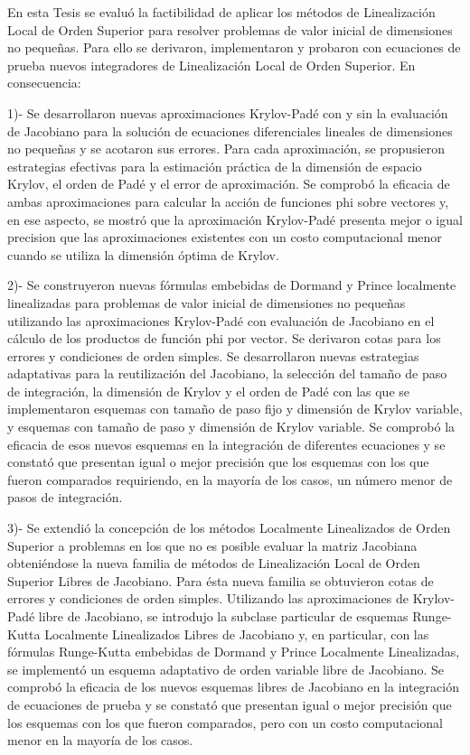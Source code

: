 \begin{conclusions}
	
	En esta Tesis se evaluó la factibilidad de aplicar los métodos de Linealización Local de Orden Superior para resolver problemas de valor inicial de dimensiones no pequeñas. Para ello se derivaron, implementaron y probaron con ecuaciones de prueba nuevos integradores de Linealización Local de Orden Superior. En consecuencia:
	
	1)- Se desarrollaron nuevas aproximaciones Krylov-Padé con y sin la evaluación de Jacobiano para la solución de ecuaciones diferenciales lineales de dimensiones no pequeñas y se acotaron sus errores.
	Para cada aproximación, se propusieron estrategias efectivas para la estimación práctica de la dimensión de espacio Krylov, el orden de Padé y el error de aproximación. Se comprobó la eficacia de
	ambas aproximaciones para calcular la acción de funciones phi sobre vectores y, en ese aspecto, se 	mostró que la aproximación Krylov-Padé 
	presenta mejor o igual precision que las aproximaciones existentes con un costo computacional menor cuando se utiliza la dimensión óptima de Krylov.
	
	2)- Se construyeron nuevas fórmulas embebidas de Dormand y Prince localmente linealizadas para problemas de valor inicial de dimensiones no pequeñas utilizando las aproximaciones Krylov-Padé
	con evaluación de Jacobiano en el cálculo de los productos de función phi por vector. Se derivaron cotas para los errores y condiciones de orden simples. Se desarrollaron nuevas estrategias adaptativas para la reutilización del Jacobiano, la selección del tamaño de paso de integración, la dimensión de Krylov
	y el orden de Padé con las que se implementaron esquemas con tamaño de paso fijo y dimensión 	de Krylov variable, y esquemas con tamaño de paso y dimensión de Krylov variable. Se comprobó
	la eficacia de esos nuevos esquemas en la integración de diferentes ecuaciones y se constató que presentan igual o mejor precisión que los esquemas con los que fueron comparados requiriendo, en
	la mayoría de los casos, un número menor de pasos de integración.
	
	3)- Se extendió la concepción de los métodos Localmente Linealizados de Orden Superior a problemas en los que no es posible evaluar la matriz Jacobiana obteniéndose la nueva familia de métodos
	de Linealización Local de Orden Superior Libres de Jacobiano. Para ésta nueva familia se obtuvieron cotas de errores y condiciones de orden simples. Utilizando las aproximaciones de Krylov-Padé libre
	de Jacobiano, se introdujo la subclase particular de esquemas Runge-Kutta Localmente Linealizados Libres de Jacobiano y, en particular, con las fórmulas Runge-Kutta embebidas de Dormand y
	Prince Localmente Linealizadas, se implementó un esquema adaptativo de orden variable libre de Jacobiano. Se comprobó la eficacia de los nuevos esquemas libres de Jacobiano en la integración de
	ecuaciones de prueba y se constató que presentan igual o mejor precisión que los esquemas con los que fueron comparados, pero con un costo computacional menor en la mayoría de los casos.
	

\end{conclusions}
